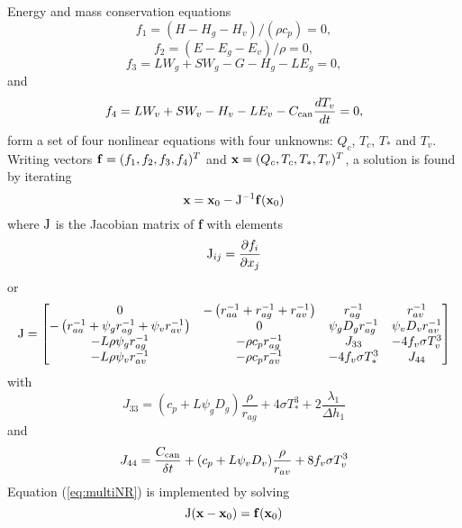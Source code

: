 \documentclass{article}
\begin{document}
Energy and mass conservation equations
\begin{equation}
f_1 = (H - H_g - H_v)/(\rho c_p) = 0,
\end{equation}
\begin{equation}
f_2 = (E - E_g - E_v)/\rho = 0,
\end{equation}
\begin{equation}
f_3 = LW_g + SW_g - G - H_g - LE_g = 0,
\label{eq:f3}
\end{equation}
and
\begin{equation}
f_4 = LW_v + SW_v - H_v - LE_v - C_{\rm can}\frac{dT_v}{dt} = 0,
\end{equation}
form a set of four nonlinear equations with four unknowns: $Q_c$, $T_c$, $T_*$ and $T_v$.
Writing vectors ${\bf f} = (f_1, f_2, f_3, f_4)^T$ and ${\bf x} = (Q_c, T_c, T_*, T_v)^T$, a solution is found by iterating 
\begin{equation}
{\bf x} = {\bf x}_0 - {\rm J}^{-1}{\bf f}({\bf x}_0)
\label{eq:multiNR}
\end{equation}
where ${\rm J}$ is the Jacobian matrix of {\bf f} with elements
\begin{equation}
{\rm J}_{ij} = \frac{\partial f_i}{\partial x_j}
\end{equation}
or
\begin{equation}
{\rm J} =
\begin{bmatrix}
0 & -\left(r_{aa}^{-1} + r_{ag}^{-1} + r_{av}^{-1} \right) & r_{ag}^{-1} & r_{av}^{-1} \\
-\left(r_{aa}^{-1} + \psi_g r_{ag}^{-1} + \psi_v r_{av}^{-1}\right) & 0 
& \psi_g D_g r_{ag}^{-1} & \psi_v D_v r_{av}^{-1} \\
-L\rho\psi_g r_{ag}^{-1} & -\rho c_p r_{ag}^{-1} & J_{33} & -4f_v\sigma T_v^3\\
-L\rho\psi_v r_{av}^{-1} & -\rho c_p r_{av}^{-1} & -4f_v\sigma T_*^3
& J_{44} \\
\end{bmatrix}
\end{equation}
with
\begin{equation}
J_{33} = (c_p+L\psi_gD_g)\frac{\rho}{r_{ag}}+4\sigma T_*^3 + 2\frac{\lambda_1}{\Delta h_1}
\end{equation}
and
\begin{equation}
J_{44} = \frac{C_{\rm can}}{\delta t}+(c_p+L\psi_v D_v)\frac{\rho}{r_{av}}+8f_v\sigma T_v^3
\end{equation}
Equation (\ref{eq:multiNR}) is implemented by solving
\begin{equation}
{\rm J}({\bf x - x}_0) = {\bf f}({\bf x}_0)
\label{eq:increments}
\end{equation}
\end{document}

